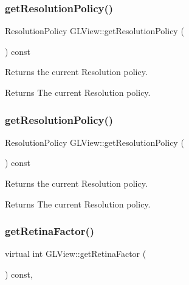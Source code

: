 \subsubsection{\texorpdfstring{get\+Resolution\+Policy()}{getResolutionPolicy()}\hspace{0.1cm}{\footnotesize\ttfamily [1/2]}}
{\footnotesize\ttfamily Resolution\+Policy G\+L\+View\+::get\+Resolution\+Policy (\begin{DoxyParamCaption}{ }\end{DoxyParamCaption}) const\hspace{0.3cm}{\ttfamily [inline]}}

Returns the current Resolution policy.

\begin{DoxyReturn}{Returns}
The current Resolution policy. 
\end{DoxyReturn}
\mbox{\label{classGLView_a826c04e9fc58895b6a7d95ba68ac1ba1}} 
\subsubsection{\texorpdfstring{get\+Resolution\+Policy()}{getResolutionPolicy()}\hspace{0.1cm}{\footnotesize\ttfamily [2/2]}}
{\footnotesize\ttfamily Resolution\+Policy G\+L\+View\+::get\+Resolution\+Policy (\begin{DoxyParamCaption}{ }\end{DoxyParamCaption}) const\hspace{0.3cm}{\ttfamily [inline]}}

Returns the current Resolution policy.

\begin{DoxyReturn}{Returns}
The current Resolution policy. 
\end{DoxyReturn}
\mbox{\label{classGLView_a5dd430351b6192d7c014458e7863ba6d}} 
\subsubsection{\texorpdfstring{get\+Retina\+Factor()}{getRetinaFactor()}\hspace{0.1cm}{\footnotesize\ttfamily [1/2]}}
{\footnotesize\ttfamily virtual int G\+L\+View\+::get\+Retina\+Factor (\begin{DoxyParamCaption}{ }\end{DoxyParamCaption}) const\hspace{0.3cm}{\ttfamily [inline]}, {\ttfamily [virtual]}}

